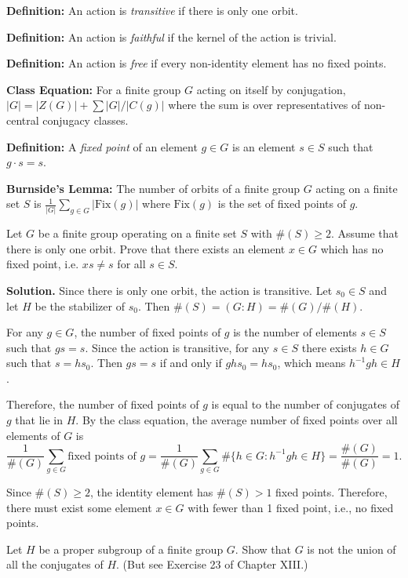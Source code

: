 \textbf{Definition:} An action is \textit{transitive} if there is only one orbit.

\textbf{Definition:} An action is \textit{faithful} if the kernel of the action is trivial.

\textbf{Definition:} An action is \textit{free} if every non-identity element has no fixed points.

\textbf{Class Equation:} For a finite group $G$ acting on itself by conjugation, $|G| = |Z(G)| + \sum |G|/|C(g)|$ where the sum is over representatives of non-central conjugacy classes.

\textbf{Definition:} A \textit{fixed point} of an element $g \in G$ is an element $s \in S$ such that $g \cdot s = s$.

\textbf{Burnside's Lemma:} The number of orbits of a finite group $G$ acting on a finite set $S$ is $\frac{1}{|G|} \sum_{g \in G} |\text{Fix}(g)|$ where $\text{Fix}(g)$ is the set of fixed points of $g$.

\begin{problembox}
Let $G$ be a finite group operating on a finite set $S$ with $\#(S) \geq 2$. Assume that there is only one orbit. Prove that there exists an element $x \in G$ which has no fixed point, i.e. $xs \neq s$ for all $s \in S$.
\end{problembox}

\noindent\textbf{Solution.} Since there is only one orbit, the action is transitive. Let $s_0 \in S$ and let $H$ be the stabilizer of $s_0$. Then $\#(S) = (G : H) = \#(G)/\#(H)$.

For any $g \in G$, the number of fixed points of $g$ is the number of elements $s \in S$ such that $gs = s$. Since the action is transitive, for any $s \in S$ there exists $h \in G$ such that $s = hs_0$. Then $gs = s$ if and only if $ghs_0 = hs_0$, which means $h^{-1}gh \in H$.

Therefore, the number of fixed points of $g$ is equal to the number of conjugates of $g$ that lie in $H$. By the class equation, the average number of fixed points over all elements of $G$ is
\[\frac{1}{\#(G)} \sum_{g \in G} \text{fixed points of } g = \frac{1}{\#(G)} \sum_{g \in G} \#\{h \in G : h^{-1}gh \in H\} = \frac{\#(G)}{\#(G)} = 1.\]

Since $\#(S) \geq 2$, the identity element has $\#(S) > 1$ fixed points. Therefore, there must exist some element $x \in G$ with fewer than 1 fixed point, i.e., no fixed points.

\begin{problembox}
Let $H$ be a proper subgroup of a finite group $G$. Show that $G$ is not the union of all the conjugates of $H$. (But see Exercise 23 of Chapter XIII.)
\end{problembox}

